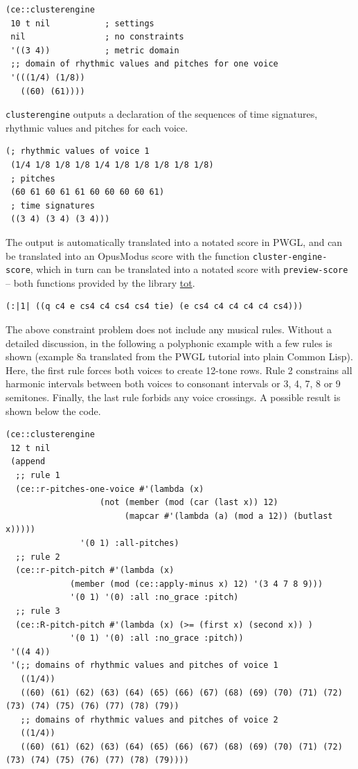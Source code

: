 \lstset{language=Lisp,label= ,caption= ,captionpos=b,numbers=none}
\begin{lstlisting}
(ce::clusterengine 
 10 t nil           ; settings
 nil                ; no constraints
 '((3 4))           ; metric domain
 ;; domain of rhythmic values and pitches for one voice
 '(((1/4) (1/8))   
   ((60) (61))))
\end{lstlisting}

\texttt{clusterengine} outputs a declaration of the sequences of time signatures, rhythmic values and pitches for each voice. 

\lstset{language=Lisp,label= ,caption= ,captionpos=b,numbers=none}
\begin{lstlisting}
(; rhythmic values of voice 1
 (1/4 1/8 1/8 1/8 1/4 1/8 1/8 1/8 1/8 1/8)
 ; pitches
 (60 61 60 61 61 60 60 60 60 61)
 ; time signatures
 ((3 4) (3 4) (3 4)))
\end{lstlisting}

The output is automatically translated into a notated score in PWGL, and can be translated into an OpusModus score with the function \texttt{cluster-engine-score}, which in turn can be translated into a notated score with \texttt{preview-score} -- both functions provided by the library \href{https://github.com/tanders/tot}{tot}.

\lstset{language=Lisp,label= ,caption= ,captionpos=b,numbers=none}
\begin{lstlisting}
(:|1| ((q c4 e cs4 c4 cs4 cs4 tie) (e cs4 c4 c4 c4 c4 cs4)))
\end{lstlisting}

The above constraint problem does not include any musical rules. Without a detailed discussion, in the following a polyphonic example with a few rules is shown (example 8a translated from the PWGL tutorial into plain Common Lisp). Here, the first rule forces both voices to create 12-tone rows. Rule 2 constrains all harmonic intervals between both voices to consonant intervals or 3, 4, 7, 8 or 9 semitones. Finally, the last rule forbids any voice crossings. A possible result is shown below the code.

\lstset{language=Lisp,label= ,caption= ,captionpos=b,numbers=none}
\begin{lstlisting}
(ce::clusterengine 
 12 t nil 
 (append 
  ;; rule 1
  (ce::r-pitches-one-voice #'(lambda (x) 
			       (not (member (mod (car (last x)) 12)
					    (mapcar #'(lambda (a) (mod a 12)) (butlast x)))))
			   '(0 1) :all-pitches)
  ;; rule 2
  (ce::r-pitch-pitch #'(lambda (x) 
			 (member (mod (ce::apply-minus x) 12) '(3 4 7 8 9)))
		     '(0 1) '(0) :all :no_grace :pitch)
  ;; rule 3
  (ce::R-pitch-pitch #'(lambda (x) (>= (first x) (second x)) )
		     '(0 1) '(0) :all :no_grace :pitch)) 
 '((4 4)) 
 '(;; domains of rhythmic values and pitches of voice 1
   ((1/4)) 
   ((60) (61) (62) (63) (64) (65) (66) (67) (68) (69) (70) (71) (72) (73) (74) (75) (76) (77) (78) (79))
   ;; domains of rhythmic values and pitches of voice 2
   ((1/4)) 
   ((60) (61) (62) (63) (64) (65) (66) (67) (68) (69) (70) (71) (72) (73) (74) (75) (76) (77) (78) (79))))
\end{lstlisting}

